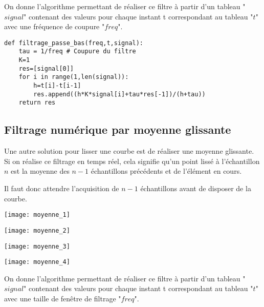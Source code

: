 On donne l'algorithme permettant de réaliser ce filtre à partir d'un tableau "$signal$" contenant des valeurs pour chaque instant t correspondant au tableau "$t$" avec une fréquence de coupure "$freq$".

\begin{lstlisting}
def filtrage_passe_bas(freq,t,signal):
    tau = 1/freq # Coupure du filtre
    K=1
    res=[signal[0]]
    for i in range(1,len(signal)):
        h=t[i]-t[i-1]
        res.append((h*K*signal[i]+tau*res[-1])/(h+tau))
    return res
\end{lstlisting}

\subsection*{Filtrage numérique par moyenne glissante}
Une autre solution pour lisser une courbe est de réaliser une moyenne glissante. Si on réalise ce filtrage en temps réel, cela signifie qu'un point lissé à l'échantillon $n$ est la moyenne des $n-1$ échantillons précédents et de l'élément en cours. 

Il faut donc attendre l'acquisition de $n-1$ échantillons avant de disposer de la courbe.


\begin{minipage}[c]{.43\linewidth}
\begin{center}
\texttt{[image: moyenne\_1]}
\end{center}
\end{minipage} \hfill
\begin{minipage}[c]{.43\linewidth}
\begin{center}
\texttt{[image: moyenne\_2]}
\end{center}
\end{minipage} 

\begin{minipage}[c]{.43\linewidth}
\begin{center}
\texttt{[image: moyenne\_3]}
\end{center}
\end{minipage} \hfill
\begin{minipage}[c]{.43\linewidth}
\begin{center}
\texttt{[image: moyenne\_4]}
\end{center}
\end{minipage}

On donne l'algorithme permettant de réaliser ce filtre à partir d'un tableau "$signal$" contenant des valeurs pour chaque instant t correspondant au tableau "$t$" avec une taille de fenêtre de filtrage "$freq$".

